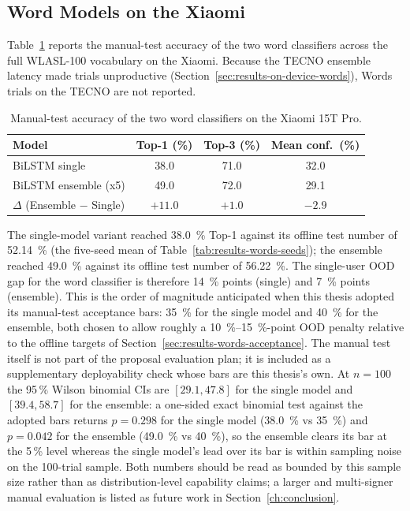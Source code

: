 \subsection{Word Models on the Xiaomi}
\label{sec:results-qualitative-words}

Table~\ref{tab:qual-words} reports the manual-test accuracy of the
two word classifiers across the full WLASL-100 vocabulary on the
Xiaomi. Because the TECNO ensemble latency made trials unproductive
(Section~\ref{sec:results-on-device-words}), Words trials on the
TECNO are not reported.

\begin{table}[!ht]
\centering
\caption{Manual-test accuracy of the two word classifiers on the Xiaomi 15T Pro.}
\label{tab:qual-words}
\begin{tabular}{lccc}
\toprule
\textbf{Model} & \textbf{Top-1 (\%)} & \textbf{Top-3 (\%)} & \textbf{Mean conf.\ (\%)} \\
\midrule
BiLSTM single                & 38.0 & 71.0 & 32.0 \\
BiLSTM ensemble (x5)         & 49.0 & 72.0 & 29.1 \\
\midrule
$\Delta$ (Ensemble $-$ Single) & $+11.0$ & $+1.0$ & $-2.9$ \\
\bottomrule
\end{tabular}
\end{table}

The single-model variant reached \SI{38.0}{\percent} Top-1 against
its offline test number of \SI{52.14}{\percent} (the five-seed
mean of Table~\ref{tab:results-words-seeds}); the ensemble reached
\SI{49.0}{\percent} against its offline test number of
\SI{56.22}{\percent}. The single-user OOD gap for the word
classifier is therefore \SI{14}{\percent} points (single) and
\SI{7}{\percent} points (ensemble). This is the order of magnitude
anticipated when this thesis adopted its manual-test acceptance
bars: \SI{35}{\percent} for the single model and
\SI{40}{\percent} for the ensemble, both chosen to allow roughly a
\SIrange{10}{15}{\percent}-point OOD penalty relative to the offline
targets of Section~\ref{sec:results-words-acceptance}. The manual
test itself is not part of the proposal evaluation plan; it is
included as a supplementary deployability check whose bars are this
thesis's own. At $n = 100$ the 95\,\% Wilson binomial CIs are
$[29.1, 47.8]$ for the single model and $[39.4, 58.7]$ for the
ensemble: a one-sided exact binomial test against the adopted bars
returns $p = 0.298$ for the single model (\SI{38.0}{\percent} vs
\SI{35}{\percent}) and $p = 0.042$ for the ensemble
(\SI{49.0}{\percent} vs \SI{40}{\percent}), so the ensemble clears
its bar at the 5\,\% level whereas the single model's lead over its
bar is within sampling noise on the 100-trial sample. Both numbers
should be read as bounded by this sample size rather than as
distribution-level capability claims; a larger and multi-signer
manual evaluation is listed as future work in
Section~\ref{ch:conclusion}.

